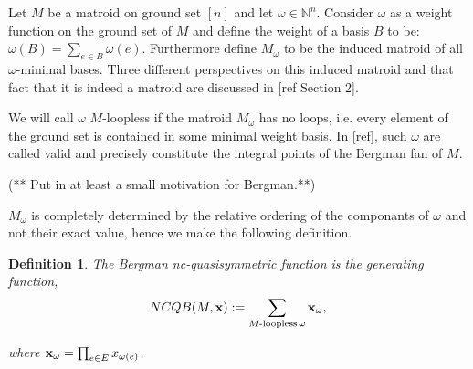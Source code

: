 \documentclass[12pt,reqno]{amsart}
\newtheorem{definition}{Definition}
\numberwithin{definition}{section}
\theoremstyle{definition}
\begin{document}





Let $M$ be a matroid on ground set $[n]$ and let $\omega \in \mathbb{N}^n$.
Consider $\omega$ as a weight function on the ground set of $M$ and define the weight of a basis $B$ to be: $\omega(B) = \sum_{e\in B} \omega(e)$. 
Furthermore define $M_{\omega}$ to be the induced matroid of all
$\omega$-minimal bases.  Three different perspectives on this induced
matroid and that fact that it is indeed a matroid are discussed in [ref Section 2].

  We will call $\omega$ $M$-loopless if the matroid $M_{\omega}$ has
  no loops, i.e.  every element of the ground set is contained in
  some minimal weight basis.  In [ref], such $\omega$ are called 
    valid and precisely constitute the integral points of the Bergman
  fan of $M$.

 (** Put in at least a small motivation for Bergman.**)

$M_{\omega}$ is completely determined by the
relative ordering of the componants of $\omega$ and not their exact
value, hence we make the following definition.


\begin{definition}
The Bergman nc-quasisymmetric function is the generating function,
$$NCQB(M,{\bf x}) := \sum_{M\textrm{-loopless} \, \omega} {\bf x}_{\omega},$$

where ${\bf x}_{\omega} = \prod_{e \in E} x_{\omega(e)}$.
\end{definition}
\end{document}
